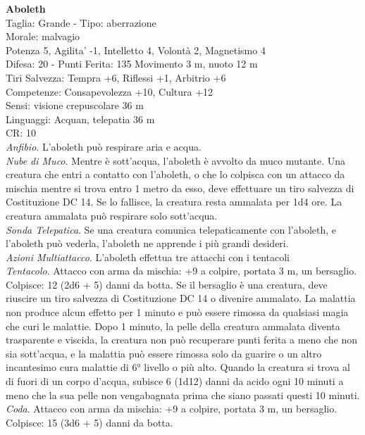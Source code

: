 \begin{multicols}{2}
\textbf{Aboleth}\\
Taglia: Grande - Tipo: aberrazione\\
Morale: malvagio\\
Potenza 5, Agilita' -1, Intelletto 4, Volontà 2, Magnetismo 4\\
Difesa: 20 - Punti Ferita: 135
Movimento 3 m, nuoto 12 m\\
Tiri Salvezza: Tempra +6, Riflessi +1, Arbitrio +6\\
Competenze: Consapevolezza +10, Cultura +12\\
Sensi: visione crepuscolare 36 m\\
Linguaggi: Acquan, telepatia 36 m\\
CR: 10\\
\textit{Anfibio}. L’aboleth può respirare aria e acqua.\\
\textit{Nube di Muco}. Mentre è sott’acqua, l’aboleth è avvolto da muco mutante. Una creatura che entri a contatto con l’aboleth, o che lo colpisca con un attacco da mischia mentre si trova entro 1 metro da esso, deve effettuare un tiro salvezza di Costituzione DC 14. Se lo fallisce, la creatura resta ammalata per 1d4 ore. La creatura ammalata può respirare solo sott’acqua.\\
\textit{Sonda Telepatica}. Se una creatura comunica telepaticamente con  l’aboleth, e l’aboleth può vederla, l’aboleth ne apprende i più grandi desideri.\\
\textit{Azioni Multiattacco}. L’aboleth effettua tre attacchi con i tentacoli\\
\textit{Tentacolo}. Attacco con arma da mischia: +9 a colpire, portata 3 m, un bersaglio.
Colpisce: 12 (2d6 + 5) danni da botta. Se il bersaglio è una creatura, deve riuscire un tiro salvezza di Costituzione DC 14 o divenire ammalato. La malattia non produce alcun effetto per 1 minuto e può essere rimossa da qualsiasi magia che curi le malattie. Dopo 1 minuto, la pelle della creatura ammalata diventa trasparente e viscida, la creatura non può recuperare punti ferita a meno che non sia sott’acqua, e la malattia può essere rimossa solo da guarire o un altro incantesimo cura malattie di 6° livello o più alto. Quando la creatura si trova al di fuori di un corpo d’acqua, subisce 6 (1d12) danni da acido ogni 10 minuti a meno che la sua pelle non vengabagnata prima che siano passati questi  10 minuti.\\
\textit{Coda}. Attacco con arma da mischia: +9 a colpire, portata 3 m, un bersaglio.
Colpisce: 15 (3d6 + 5) danni da botta.\\

\end{multicols}
